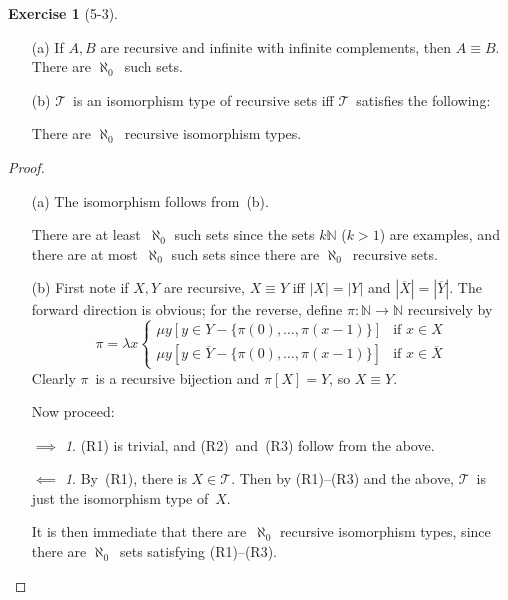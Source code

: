 \documentclass[letterpaper]{article}
\newcommand{\N}{\mathbb{N}}
\newcommand{\T}{\mathcal{T}}
\newcommand{\iso}{\equiv}
\newcommand{\comp}[1]{\overline{#1}}
\newcommand{\card}[1]{|{#1}|}
\theoremstyle{definition}
\newtheorem*{exer}{Exercise}
\theoremstyle{remark}
\theoremstyle{direction}
\newtheorem*{fwd}{$\implies$}
\newtheorem*{bwd}{$\impliedby$}
\begin{document}
\begin{exer}[5-3]
\begin{enumerate}[itemsep=0pt]
\item[(a)] If $A,B$ are recursive and infinite with infinite complements, then $A\iso B$. There are $\aleph_0$~such sets.
\item[(b)] $\T$~is an isomorphism type of recursive sets iff $\T$~satisfies the following:
There are $\aleph_0$~recursive isomorphism types.
\end{enumerate}
\end{exer}
\begin{proof}
\begin{enumerate}[itemsep=0pt]
\item[(a)] The isomorphism follows from~(b).

There are at least~$\aleph_0$ such sets since the sets $k\N$ ($k>1$) are examples, and there are at most~$\aleph_0$ such sets since there are $\aleph_0$~recursive sets.
\item[(b)]
First note if $X,Y$ are recursive, $X\iso Y$ iff $\card{X}=\card{Y}$ and $\card{\comp{X}}=\card{\comp{Y}}$. The forward direction is obvious; for the reverse, define $\pi:\N\to\N$ recursively by
$$\pi=\lambda x\begin{cases}
\mu y[y\in Y-\{\pi(0),\ldots,\pi(x-1)\}]&\text{if }x\in X\\
\mu y[y\in\comp{Y}-\{\pi(0),\ldots,\pi(x-1)\}]&\text{if }x\in\comp{X}
\end{cases}$$
Clearly $\pi$~is a recursive bijection and $\pi[X]=Y$, so $X\iso Y$.

Now proceed:
\begin{fwd}
(R1) is trivial, and (R2)~and~(R3) follow from the above.
\end{fwd}
\begin{bwd}
By~(R1), there is $X\in\T$. Then by (R1)--(R3) and the above, $\T$~is just the isomorphism type of~$X$.
\end{bwd}
It is then immediate that there are~$\aleph_0$ recursive isomorphism types, since there are $\aleph_0$~sets satisfying (R1)--(R3).
\end{enumerate}
\end{proof}
\end{document}
